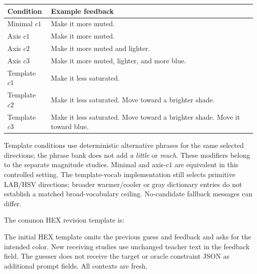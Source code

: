 \begin{center}
\small
\begin{tabular}{@{}lp{}@{}}
\toprule
Condition & Example feedback \\
\midrule
Minimal $c1$ & Make it more muted. \\
Axis $c1$ & Make it more muted. \\
Axis $c2$ & Make it more muted and lighter. \\
Axis $c3$ & Make it more muted, lighter, and more blue. \\
Template $c1$ & Make it less saturated. \\
Template $c2$ & Make it less saturated. Move toward a brighter shade. \\
Template $c3$ & Make it less saturated. Move toward a brighter shade.
Move it toward blue. \\
\bottomrule
\end{tabular}
\end{center}

Template conditions use deterministic alternative phrases for the same
selected directions; the phrase bank does not add \emph{a little} or
\emph{much}. These modifiers belong to the separate magnitude studies.
Minimal and axis-$c1$ are equivalent in this controlled setting.
The template-vocab implementation still selects primitive LAB/HSV directions;
broader warmer/cooler or gray dictionary entries do not establish a matched
broad-vocabulary ceiling. No-candidate fallback messages can differ.

The common HEX revision template is:
\begin{quote}\small\ttfamily\raggedright
{}\par\medskip
{}\par
{}\par\medskip
{}\par
{}\par\medskip
{}\par
{}\par
\end{quote}
The initial HEX template omits the previous guess and feedback and asks
for the intended color. New receiving studies use unchanged teacher text
in the feedback field. The guesser does not receive the target or oracle
constraint JSON as additional prompt fields. All contexts are fresh.

